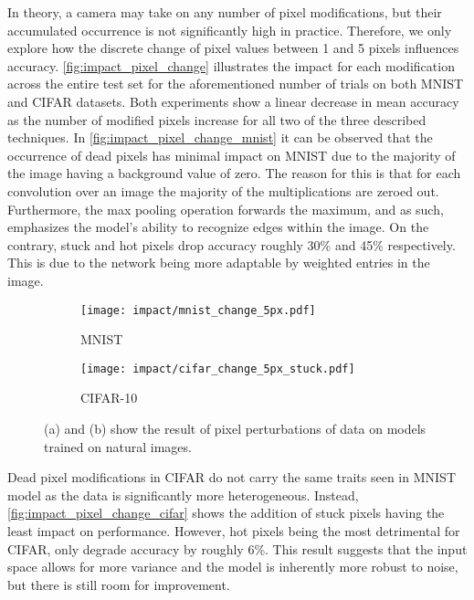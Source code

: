 \documentclass[conference]{IEEEtran}
\begin{document}
In theory, a camera may take on any number of pixel modifications, but their accumulated occurrence is not significantly high in practice. Therefore, we only explore how the discrete change of pixel values between 1 and 5 pixels influences accuracy. \autoref{fig:impact_pixel_change} illustrates the impact for each modification across the entire test set for the aforementioned number of trials on both MNIST and CIFAR datasets. Both experiments show a linear decrease in mean accuracy as the number of modified pixels increase for all two of the three described techniques. In \autoref{fig:impact_pixel_change_mnist} it can be observed that the occurrence of dead pixels has minimal impact on MNIST due to the majority of the image having a background value of zero. The reason for this is that for each convolution over an image the majority of the multiplications are zeroed out. Furthermore, the max pooling operation forwards the maximum, and as such, emphasizes the model's ability to recognize edges within the image. On the contrary, stuck and hot pixels drop accuracy roughly 30\% and 45\% respectively. This is due to the network being more adaptable by weighted entries in the image.

\begin{figure}[H]
    \centering
    \begin{subfigure}{0.45\columnwidth}
        \centering
        \texttt{[image: impact/mnist\_change\_5px.pdf]}
        \caption{MNIST}
        \label{fig:impact_pixel_change_mnist}
    \end{subfigure}
    \begin{subfigure}{0.45\columnwidth}
        \centering
        \texttt{[image: impact/cifar\_change\_5px\_stuck.pdf]}
        \caption{CIFAR-10}
        \label{fig:impact_pixel_change_cifar}
    \end{subfigure}
    \captionsetup{width=0.90\columnwidth}
    \caption{(a) and (b) show the result of pixel perturbations of data on models trained on natural images.}
    \label{fig:impact_pixel_change}
\end{figure}

Dead pixel modifications in CIFAR do not carry the same traits seen in MNIST model as the data is significantly more heterogeneous. Instead, \autoref{fig:impact_pixel_change_cifar} shows the addition of stuck pixels having the least impact on performance. However, hot pixels being the most detrimental for CIFAR, only degrade accuracy by roughly 6\%. This result suggests that the input space allows for more variance and the model is inherently more robust to noise, but there is still room for improvement.
\end{document}
